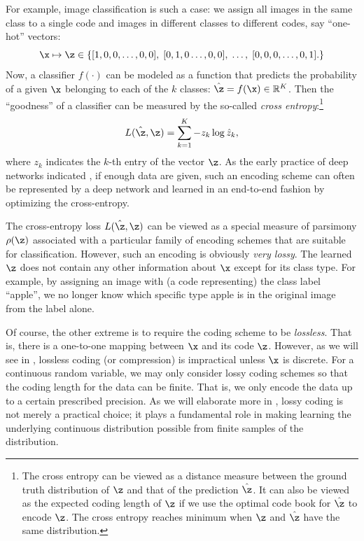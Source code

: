 \documentclass[../../book-main.tex]{subfiles}
\begin{document}
\begin{example}
For example, image classification is such a case: we assign all images in the same class to a single code and images in different classes to different codes, say ``one-hot'' vectors:
\begin{equation}
  \x \mapsto \z \in \{  [1, 0, 0, \ldots , 0, 0], \;  [0, 1, 0 \ldots, 0, 0], \; \ldots, \;  [0,0,0, \ldots, 0, 1].\}
  \label{eqn:class-labels}
\end{equation}
Now, a classifier $f(\cdot)$ can be modeled as a function that predicts the probability of a given $\x$ belonging to each of the $k$ classes: $\hat{\z} = f(\x) \in \mathbb{R}^K$. Then the ``goodness'' of a classifier can be measured by the so-called {\em cross entropy}:\footnote{The cross entropy can be viewed as a distance measure between the ground truth distribution of $\z$ and that of the prediction $\hat\z$. It can also be viewed as the expected coding length of $\z$ if we use the optimal code book for $\hat \z$ to encode $\z$. The cross entropy reaches minimum when $\z$ and $\hat \z$ have the same distribution.}
\begin{equation}
    L(\hat{\z}, \z) = \sum_{k=1}^K - z_k \log \hat{z}_k,
\end{equation}
where $z_k$ indicates the $k$-th entry of the vector $\z$. As the early practice of deep networks indicated \cite{krizhevsky2012imagenet}, if enough data are given, such an encoding scheme can often be represented by a deep network and learned in an end-to-end fashion by optimizing the cross-entropy. 
\end{example}

The cross-entropy loss $L(\hat \z, \z)$ can be viewed as a special measure of parsimony $\rho(\z)$ associated with a particular family of encoding schemes that are suitable for classification. However, such an encoding is obviously {\em very lossy}. The learned $\z$ does not contain any other information about $\x$ except for its class type. For example, by assigning an image with (a code representing) the class label ``apple'', we no longer know which specific type apple is in the original image from the label alone. 

Of course, the other extreme is to require the coding scheme to be {\em lossless}. That is, there is a one-to-one mapping between $\x$ and its code $\z$. However, as we will see in , lossless coding (or compression) is impractical unless $\x$ is discrete. For a continuous random variable, we may only consider lossy coding schemes so that the coding length for the data can be finite. That is, we only encode the data up to a certain prescribed precision. As we will elaborate more in , lossy coding is not merely a practical choice; it plays a fundamental role in making learning the underlying continuous distribution possible from finite samples of the distribution. 
\end{document}
